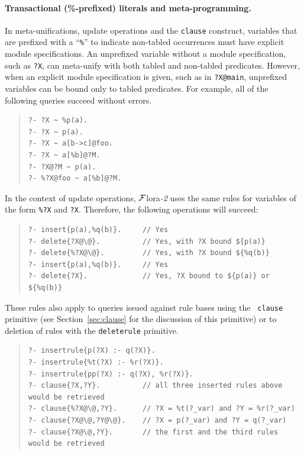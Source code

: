 \documentclass[11pt]{article}
\newcommand{\FLORA}{{\mbox{\sc ${\cal F}${lora}\rm\emph{-2}}}\xspace}
\newcommand{\FLSYSTEM}{\FLORA}
\begin{document}
\paragraph{Transactional (\%-prefixed) literals and meta-programming.}
In meta-unifications, update operations and the {\tt clause} construct,
variables that are prefixed with a ``{\tt \%}'' to indicate non-tabled
occurrences must have explicit module specifications. An unprefixed
variable without a module specification, such as {\tt ?X}, can meta-unify
with both tabled and non-tabled predicates.  However, when an explicit
module specification is given, such as in {\tt ?X@main}, unprefixed
variables can be bound only to tabled predicates. For example,
all of the following queries succeed without errors.

\begin{quote}
\begin{verbatim}
?- ?X ~ %p(a).      
?- ?X ~ p(a).         
?- ?X ~ a[b->c]@foo.  
?- ?X ~ a[%b]@?M.      
?- ?X@?M ~ p(a).     
?- %?X@foo ~ a[%b]@?M.
\end{verbatim}
\end{quote}

In the context of update operations, \FLSYSTEM uses the same rules for
variables of the form {\tt \%?X} and {\tt ?X}. Therefore, the
following operations will succeed:
\begin{quote}
\begin{verbatim}
?- insert{p(a),%q(b)}.     // Yes
?- delete{?X@\@}.          // Yes, with ?X bound ${p(a)}
?- delete{%?X@\@}.         // Yes, with ?X bound ${%q(b)}
?- insert{p(a),%q(b)}.     // Yes
?- delete{?X}.             // Yes, ?X bound to ${p(a)} or ${%q(b)}
\end{verbatim}
\end{quote}

These rules also apply to queries issued against rule bases using the {\tt
  clause} primitive (see Section~\ref{sec:clause} for the discussion of this
primitive) or to deletion of rules with the {\tt deleterule} primitive.

\begin{quote}
\begin{verbatim}
?- insertrule{p(?X) :- q(?X)}.  
?- insertrule{%t(?X) :- %r(?X)}.
?- insertrule{pp(?X) :- q(?X), %r(?X)}.
?- clause{?X,?Y}.          // all three inserted rules above would be retrieved
?- clause{%?X@\@,?Y}.      // ?X = %t(?_var) and ?Y = %r(?_var)
?- clause{?X@\@,?Y@\@}.    // ?X = p(?_var) and ?Y = q(?_var)
?- clause{?X@\@,?Y}.       // the first and the third rules would be retrieved
\end{verbatim}
\end{quote}
\end{document}
